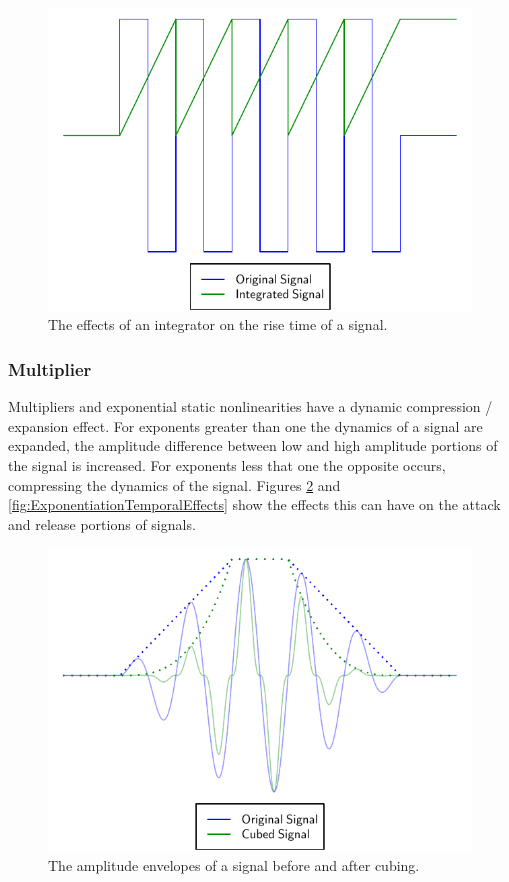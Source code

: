 			\begin{figure}[h!]
				\centering
				\includegraphics{chapter5/Images/IntegratorTemporalEffects.pdf}
				\caption{The effects of an integrator on the rise time of a signal.}
				\label{fig:IntegratorTemporalEffects}
			\end{figure}
			
		\subsubsection*{Multiplier}
			Multipliers and exponential static nonlinearities have a dynamic compression / expansion effect.
			For exponents greater than one the dynamics of a signal are expanded, the amplitude difference
			between low and high amplitude portions of the signal is increased. For exponents less that one the
			opposite occurs, compressing the dynamics of the signal. Figures
			\ref{fig:MultiplierTemporalEffects} and \ref{fig:ExponentiationTemporalEffects} show the effects
			this can have on the attack and release portions of signals.

			\begin{figure}[h!]
				\centering
				\includegraphics{chapter5/Images/MultiplierTemporalEffects.pdf}
				\caption{The amplitude envelopes of a signal before and after cubing.}
				\label{fig:MultiplierTemporalEffects}
			\end{figure}

